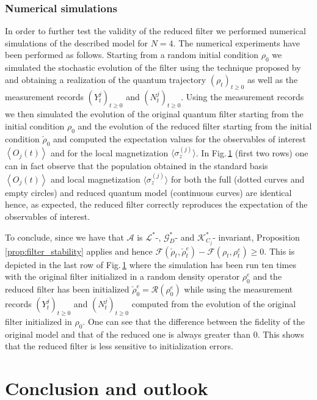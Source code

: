 \documentclass[aihp,12pt]{imsart}
\newcommand{\Gc}{\mathcal{G}}
\newcommand{\Rc}{\mathcal{R}}
\newcommand{\Kc}{\mathcal{K}}
\newcommand{\Lc}{\mathcal{L}}
\newcommand{\As}{\mathscr{A}}
\newcommand{\Fs}{\mathscr{F}}
\newcommand{\expect}[1]{\left< #1 \right>}
\theoremstyle{theorem}
\theoremstyle{definition}
\theoremstyle{remark}
\begin{document}
\begin{figure}[th]
    \label{fig:numerical_simulation}
\end{figure}

\subsubsection{Numerical simulations}
In order to further test the validity of the reduced filter we performed numerical simulations of the described model for $N=4$. 
The numerical experiments have been performed as follows. Starting from a random initial condition $\rho_0$ we simulated the stochastic evolution of the filter using the technique proposed by \cite{rouchon_efficient_2015} and obtaining a realization of the quantum trajectory $(\rho_t)_{t\geq 0}$ as well as the measurement records $(Y_t^j)_{t\geq0}$ and $(N_t^j)_{t\geq 0}$. Using the measurement records we then simulated the evolution of the original quantum filter starting from the initial condition $\rho_0$ and the evolution of the reduced filter starting from the initial condition $\check{\rho}_0$ and computed the expectation values for the observables of interest $\expect{O_j(t)}$ and for the local magnetization $\langle{\sigma_z^{(j)}}\rangle$. In Fig.\,\ref{fig:numerical_simulation} (first two rows) one can in fact observe that the population obtained in the standard basis $\expect{O_j(t)}$ and local magnetization $\langle\sigma_z^{(j)}\rangle$ for both the full (dotted curves and empty circles) and reduced quantum model (continuous curves) are identical hence, as expected, the reduced filter correctly reproduces the expectation of the observables of interest. 

To conclude, since we have that $\As$ is $\Lc^*$-, $\Gc_D^*$- and $\Kc_{C_j}^*$- invariant, Proposition \ref{prop:filter_stability} applies and hence $\Fs(\check{\rho}_t,\check{\rho}_t^e)-\Fs(\rho_t,\rho_t^e)\geq0$. This is depicted in the last row of Fig.\,\ref{fig:numerical_simulation} where the simulation has been run ten times with the original filter initialized in a random density operator $\rho_0^e$ and the reduced filter has been initialized $\check{\rho}_0^e = \Rc(\rho_0^e)$ while using the measurement records $(Y_t^j)_{t\geq0}$ and $(N_t^j)_{t\geq 0}$ computed from the evolution of the original filter initialized in $\rho_0$. One can see that the difference between the fidelity of the original model and that of the reduced one is always greater than 0. This shows that the reduced filter is less sensitive to initialization errors. 

\section{Conclusion and outlook}
\end{document}
